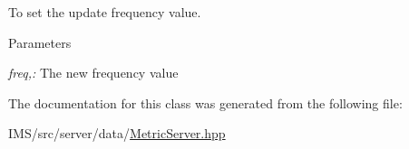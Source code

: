 To set the update frequency value. 


\begin{DoxyParams}{Parameters}
\item[{\em freq,:}]The new frequency value \end{DoxyParams}


The documentation for this class was generated from the following file:\begin{DoxyCompactItemize}
\item 
IMS/src/server/data/\hyperlink{MetricServer_8hpp}{MetricServer.hpp}\end{DoxyCompactItemize}
